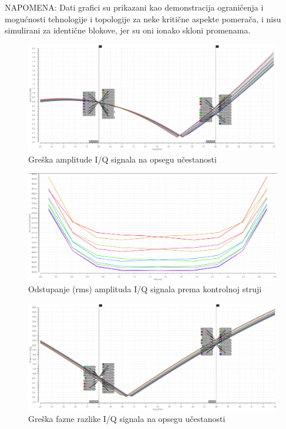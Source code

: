 \documentclass[journal,twocolumn,letterpaper]{IEEEJERM}
\begin{document}
NAPOMENA:
Dati grafici su prikazani kao demonstracija ograničenja i mogućnosti tehnologije i topologije za neke kritične aspekte pomerača, i nisu simulirani za identične blokove, jer su oni ionako skloni promenama.


\begin{figure}[!htbp]
  \centering
  \includegraphics[width=\linewidth]{gain_error.png}
  \caption{Greška amplitude I/Q signala na opsegu učestanosti}
  \label{fig:gain_error}
\end{figure}

\begin{figure}[!htbp]
  \centering
  \includegraphics[width=\linewidth]{gain_error_rms.png}
  \caption{Odstupanje (rms) amplituda I/Q signala prema kontrolnoj struji}
  \label{fig:gain_error_rms}
\end{figure}

\begin{figure}[!htbp]
  \centering
  \includegraphics[width=\linewidth]{phase_error.png}
  \caption{Greška fazne razlike I/Q signala na opsegu učestanosti}
  \label{fig:phase_error}
\end{figure}
\end{document}
